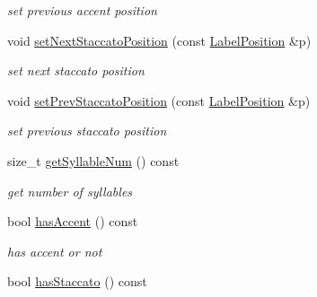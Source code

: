 \begin{DoxyCompactItemize}
\begin{DoxyCompactList}\small\item\em set previous accent position \end{DoxyCompactList}\item 
\hypertarget{classsinsy_1_1NoteLabeler_a9440199882ee72394e65b909a850eae6}{void \hyperlink{classsinsy_1_1NoteLabeler_a9440199882ee72394e65b909a850eae6}{set\-Next\-Staccato\-Position} (const \hyperlink{classsinsy_1_1LabelPosition}{\-Label\-Position} \&p)}\label{classsinsy_1_1NoteLabeler_a9440199882ee72394e65b909a850eae6}

\begin{DoxyCompactList}\small\item\em set next staccato position \end{DoxyCompactList}\item 
\hypertarget{classsinsy_1_1NoteLabeler_abb3aa7af6ac0a0dc232bee355f754f45}{void \hyperlink{classsinsy_1_1NoteLabeler_abb3aa7af6ac0a0dc232bee355f754f45}{set\-Prev\-Staccato\-Position} (const \hyperlink{classsinsy_1_1LabelPosition}{\-Label\-Position} \&p)}\label{classsinsy_1_1NoteLabeler_abb3aa7af6ac0a0dc232bee355f754f45}

\begin{DoxyCompactList}\small\item\em set previous staccato position \end{DoxyCompactList}\item 
\hypertarget{classsinsy_1_1NoteLabeler_aa86d0a233d1668cefba30448ae22e633}{size\-\_\-t \hyperlink{classsinsy_1_1NoteLabeler_aa86d0a233d1668cefba30448ae22e633}{get\-Syllable\-Num} () const }\label{classsinsy_1_1NoteLabeler_aa86d0a233d1668cefba30448ae22e633}

\begin{DoxyCompactList}\small\item\em get number of syllables \end{DoxyCompactList}\item 
\hypertarget{classsinsy_1_1NoteLabeler_a2bbb700b2b7821989fc483e73956026d}{bool \hyperlink{classsinsy_1_1NoteLabeler_a2bbb700b2b7821989fc483e73956026d}{has\-Accent} () const }\label{classsinsy_1_1NoteLabeler_a2bbb700b2b7821989fc483e73956026d}

\begin{DoxyCompactList}\small\item\em has accent or not \end{DoxyCompactList}\item 
\hypertarget{classsinsy_1_1NoteLabeler_aeceb66873cede3f7cea5f586238df450}{bool \hyperlink{classsinsy_1_1NoteLabeler_aeceb66873cede3f7cea5f586238df450}{has\-Staccato} () const }\label{classsinsy_1_1NoteLabeler_aeceb66873cede3f7cea5f586238df450}


\end{DoxyCompactItemize}
